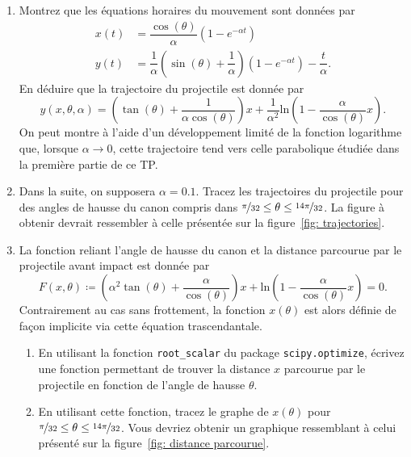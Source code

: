 \documentclass[a4paper,12pt]{article} %
\begin{document}
\begin{enumerate}
\item Montrez que les équations horaires du mouvement sont données par
  \[
  \begin{aligned}
    x(t) & = \dfrac{\cos(\theta)}{\alpha} \left( 1 - e^{-\alpha t} \right) \\
    y(t) & = \dfrac{1}{\alpha} \left( \sin(\theta) + \dfrac{1}{\alpha} \right) \left( 1 - e^{-\alpha t} \right) - \dfrac{t}{\alpha}.
  \end{aligned}
  \]
  En déduire que la trajectoire du projectile est donnée par
  \[
  y(x, \theta, \alpha) = \left( \tan(\theta) + \dfrac{1}{\alpha \cos(\theta)} \right) x + \dfrac{1}{\alpha^2} \mathrm{ln} \left( 1 - \dfrac{\alpha}{\cos(\theta)}x \right).
  \]
  On peut montre à l'aide d'un développement limité de la fonction logarithme que, lorsque $\alpha \to 0$, cette trajectoire tend vers celle parabolique étudiée dans la première partie de ce TP.

\item Dans la suite, on supposera $\alpha = 0.1$.
  Tracez les trajectoires du projectile pour des angles de hausse du canon compris dans $\nicefrac{\pi}{32} \leq \theta \leq \nicefrac{14\pi}{32}$.
  La figure à obtenir devrait ressembler à celle présentée sur la figure~\ref{fig: trajectories}.

\item La fonction reliant l'angle de hausse du canon et la distance parcourue par le projectile avant impact est donnée par
  \[
  F(x, \theta) \coloneqq \left( \alpha^2 \tan(\theta) + \dfrac{\alpha}{\cos(\theta)} \right) x + \mathrm{ln}\left( 1 - \dfrac{\alpha}{\cos(\theta)}x \right) = 0.
  \]
  Contrairement au cas sans frottement, la fonction $x(\theta)$ est alors définie de façon implicite via cette équation trascendantale.
  \begin{enumerate}
  \item En utilisant la fonction \verb+root_scalar+ du package \verb+scipy.optimize+, écrivez une fonction permettant de trouver la distance $x$ parcourue par le projectile en fonction de l'angle de hausse $\theta$.

  \item En utilisant cette fonction, tracez le graphe de $x(\theta)$ pour $\nicefrac{\pi}{32} \leq \theta \leq \nicefrac{14\pi}{32}$.
    Vous devriez obtenir un graphique ressemblant à celui présenté sur la figure~\ref{fig: distance parcourue}.
  \end{enumerate}

\end{enumerate}
\end{document}
